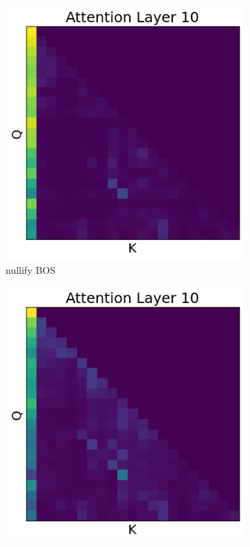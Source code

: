 \documentclass[11pt]{article}
\begin{document}
\begin{figure}[t!]
  \newcommand{\bottomsep}{0.02\textwidth} %

  \begin{subfigure}[t]{0.22\textwidth}
    \centering
    \includegraphics[width=0.86\linewidth]{figures/obs4_intervention4.png}
    \caption{nullify BOS}
    \label{fig:intervention4}
  \end{subfigure}\hspace{\bottomsep}
  \begin{subfigure}[t]{0.22\textwidth}
    \centering
    \includegraphics[width=0.86\linewidth]{figures/obs4_intervention5.png}

\end{subfigure}
\end{figure}
\end{document}
